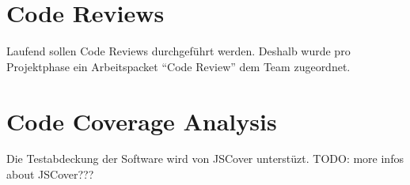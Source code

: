 \section{Code Reviews}
Laufend sollen Code Reviews durchgeführt werden. Deshalb wurde pro Projektphase ein Arbeitspacket ``Code Review'' dem Team zugeordnet.


\section{Code Coverage Analysis}
Die Testabdeckung der Software wird von JSCover \cite{JSCover} unterstüzt.
\newline TODO: more infos about JSCover???
